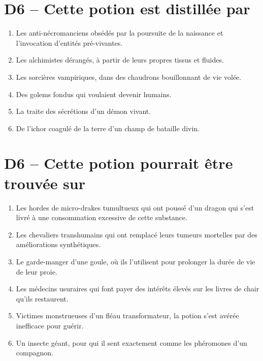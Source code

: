 \documentclass{article}
\begin{document}
\section*{D6 -- Cette potion est distillée par}
\begin{enumerate}
	\item Les anti-nécromanciens obsédés par la poursuite de la naissance et l’invocation d'entités pré-vivantes.
	\item Les alchimistes dérangés, à partir de leurs propres tissus et fluides.
	\item Les sorcières vampiriques, dans des chaudrons bouillonnant de vie volée.
	\item Des golems fondus qui voulaient devenir humains.
	\item La traite des sécrétions d'un démon vivant.
	\item De l'ichor coagulé de la terre d'un champ de bataille divin.
\end{enumerate}

\section*{D6 -- Cette potion pourrait être trouvée sur}
\begin{enumerate}
	\item Les hordes de micro-drakes tumultueux qui ont poussé d'un dragon qui s'est livré à une consommation excessive de cette substance.
	\item Les chevaliers transhumains qui ont remplacé leurs tumeurs mortelles par des améliorations synthétiques.
	\item Le garde-manger d'une goule, où ils l'utilisent pour prolonger la durée de vie de leur proie.
	\item Les médecins usuraires qui font payer des intérêts élevés sur les livres de chair qu'ils restaurent.
	\item Victimes monstrueuses d'un fléau transformateur, la potion s'est avérée inefficace pour guérir.
	\item Un insecte géant, pour qui il sent exactement comme les phéromones d'un compagnon.
\end{enumerate}
\end{document}
